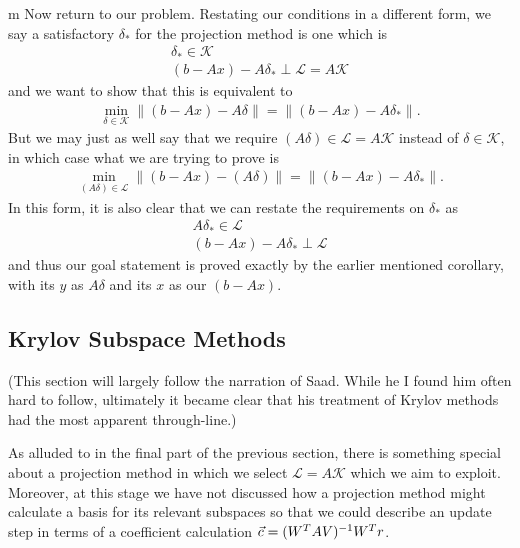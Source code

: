 \documentclass[11pt]{article}
\begin{document}
\begin{my proof}{m}
Now return to our problem. Restating our conditions in a different form, we say a satisfactory $\delta_*$ for the projection method is one which is \begin{gather*}
\delta_* \in \mathcal{K} \\
(b - Ax) - A\delta_* \perp \mathcal L = A \mathcal K
\end{gather*}
and we want to show that this is equivalent to \begin{gather*}
\min_{\delta \in \mathcal K} \lVert (b - Ax) - A \delta \rVert = \lVert (b - Ax) - A\delta_* \rVert.
\end{gather*}
But we may just as well say that we require $(A\delta) \in \mathcal L = A \mathcal K$ instead of $\delta \in \mathcal K$, in which case what we are trying to prove is \begin{gather*}
\min_{(A\delta) \in \mathcal L} \lVert (b - Ax) - (A \delta) \rVert = \lVert (b - Ax) - A\delta_* \rVert.
\end{gather*}
In this form, it is also clear that we can restate the requirements on $\delta_*$ as \begin{gather*}
A \delta_* \in \mathcal{L} \\
(b - Ax) - A\delta_* \perp \mathcal L
\end{gather*}
and thus our goal statement is proved exactly by the earlier mentioned corollary, with its $y$ as $A \delta$ and its $x$ as our $(b-Ax)$.
\end{my proof}

\subsection{Krylov Subspace Methods}

(This section will largely follow the narration of Saad. While he I found him often hard to follow, ultimately it became clear that his treatment of Krylov methods had the most apparent through-line.)

As alluded to in the final part of the previous section, there is something special about a projection method in which we select $\mathcal L = A \mathcal K$ which we aim to exploit. Moreover, at this stage we have not discussed how a projection method might calculate a basis for its relevant subspaces so that we could describe an update step in terms of a coefficient calculation $\vec c = (W^T A V)^{-1} W^T r$. 
\end{document}
